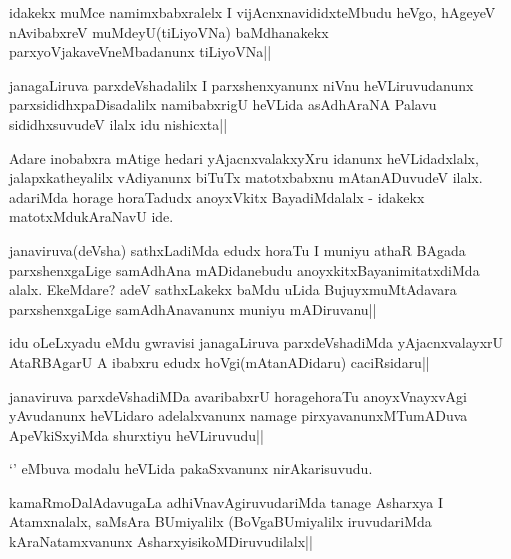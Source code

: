\begin{artha}
idakekx muMce namimxbabxralelx I vijAcnxnavididxteMbudu heVgo, hAgeyeV nAvibabxreV muMdeyU(tiLiyoVNa) baMdhanakekx parxyoVjakaveVneMbadanunx tiLiyoVNa||
\end{artha}

\begin{artha}
janagaLiruva parxdeVshadalilx I parxshenxyanunx niVnu heVLiruvudanunx parxsididhxpaDisadalilx namibabxrigU heVLida asAdhAraNA Palavu sididhxsuvudeV ilalx idu nishicxta||
\end{artha}

\begin{artha}
Adare inobabxra mAtige hedari yAjacnxvalakxyXru idanunx heVLidadxlalx, jalapxkatheyalilx vAdiyanunx biTuTx matotxbabxnu mAtanADuvudeV ilalx. adariMda horage horaTadudx anoyxVkitx BayadiMdalalx - idakekx matotxMdukAraNavU ide.
\end{artha}

\begin{artha}
janaviruva(deVsha) sathxLadiMda edudx horaTu I muniyu athaR BAgada parxshenxgaLige samAdhAna mADidanebudu anoyxkitxBayanimitatxdiMda alalx. EkeMdare? adeV sathxLakekx baMdu uLida BujuyxmuMtAdavara parxshenxgaLige samAdhAnavanunx muniyu mADiruvanu||
\end{artha}


\begin{artha}
idu oLeLxyadu eMdu gwravisi janagaLiruva parxdeVshadiMda yAjacnxvalayxrU AtaRBAgarU A ibabxru edudx hoVgi(mAtanADidaru) caciRsidaru||
\end{artha}


\begin{artha}
janaviruva parxdeVshadiMDa avaribabxrU horagehoraTu anoyxVnayxvAgi yAvudanunx heVLidaro 
adelalxvanunx namage pirxyavanunxMTumADuva ApeVkiSxyiMda shurxtiyu heVLiruvudu||
\end{artha}


\begin{artha}
`\stext' eMbuva modalu heVLida pakaSxvanunx nirAkarisuvudu.
\end{artha}

\begin{artha}
kamaRmoDalAdavugaLa adhiVnavAgiruvudariMda tanage Asharxya I Atamxnalalx, saMsAra 
BUmiyalilx (BoVgaBUmiyalilx iruvudariMda kAraNatamxvanunx AsharxyisikoMDiruvudilalx||
\end{artha}


